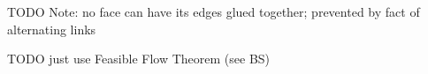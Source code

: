 

TODO
Note: no face can have its edges glued together; prevented by fact
of alternating links

TODO just use Feasible Flow Theorem (see BS)

